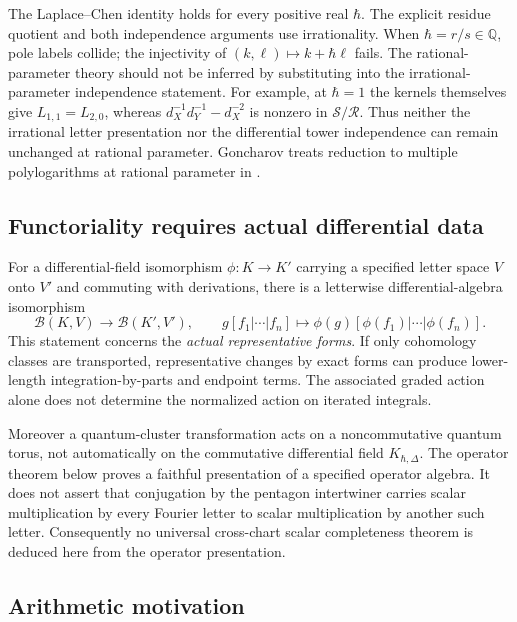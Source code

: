 \documentclass[11pt]{article}
\numberwithin{equation}{section}
\theoremstyle{definition}
\theoremstyle{remark}
\newcommand{\Q}{\mathbb Q}
\newcommand{\calR}{\mathcal R}
\newcommand{\calS}{\mathcal S}
\newcommand{\calB}{\mathcal B}
\newcommand{\qh}{\hbar}
\begin{document}
The Laplace--Chen identity holds for every positive real $\qh$. The explicit
residue quotient and both independence arguments use irrationality. When
$\qh=r/s\in\Q$, pole labels collide; the injectivity of
$(k,\ell)\mapsto k+\qh\ell$ fails. The rational-parameter theory should not
be inferred by substituting into the irrational-parameter independence
statement. For example, at $\qh=1$ the kernels themselves give
$L_{1,1}=L_{2,0}$, whereas
$d_X^{-1}d_Y^{-1}-d_X^{-2}$ is nonzero in $\calS/\calR$.
Thus neither the irrational letter presentation nor the differential tower
independence can remain unchanged at rational parameter. Goncharov treats reduction to multiple polylogarithms at rational
parameter in \cite[Theorems~3.2--3.3]{Goncharov2026}.

\subsection{Functoriality requires actual differential data}

For a differential-field isomorphism $\phi:K\to K'$ carrying a specified
letter space $V$ onto $V'$ and commuting with derivations, there is a
letterwise differential-algebra isomorphism
\[
 \calB(K,V)\longrightarrow\calB(K',V'),\qquad
 g[f_1|\cdots|f_n]\longmapsto
 \phi(g)[\phi(f_1)|\cdots|\phi(f_n)].
\]
This statement concerns the \emph{actual representative forms}. If only
cohomology classes are transported, representative changes by exact forms
can produce lower-length integration-by-parts and endpoint terms. The
associated graded action alone does not determine the normalized action on
iterated integrals.

Moreover a quantum-cluster transformation acts on a noncommutative quantum
torus, not automatically on the commutative differential field
$K_{\qh,\Delta}$. The operator theorem below proves a faithful presentation
of a specified operator algebra. It does not assert that conjugation by the
pentagon intertwiner carries scalar multiplication by every Fourier letter
to scalar multiplication by another such letter. Consequently no universal
cross-chart scalar completeness theorem is deduced here from the operator
presentation.

\subsection{Arithmetic motivation}
\end{document}
